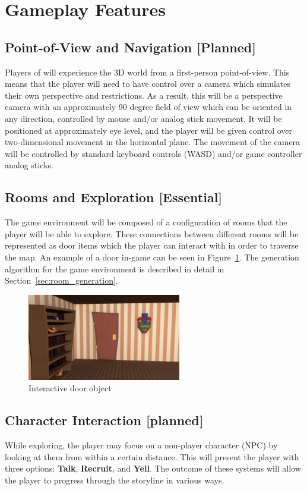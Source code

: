 \documentclass{GlobalDocument}
\begin{document}
\section {Gameplay Features}
\subsection{Point-of-View and Navigation [Planned]}
Players of \ourgame{} will experience the 3D world from a first-person point-of-view. This means that the player will need to have control over a camera which simulates their own perspective and restrictions. As a result, this will be a perspective camera with an approximately 90 degree field of view which can be oriented in any direction, controlled by mouse and/or analog stick movement. It will be positioned at approximately eye level, and the player will be given control over two-dimensional movement in the horizontal plane. The movement of the camera will be controlled by standard keyboard controls (WASD) and/or game controller analog sticks.

\subsection{Rooms and Exploration [Essential]}
The game environment will be composed of a configuration of rooms that the player will be able to explore. These connections between different rooms will be represented as door items which the player can interact with in order to traverse the map. An example of a door in-game can be seen in Figure~\ref{fig:door}. The generation algorithm for the game environment is described in detail in Section~\ref{sec:room_generation}.

\begin{figure}[htb]
\centering
\includegraphics[width=0.6\textwidth]{images/Door2}
\caption{Interactive door object}
\label{fig:door}
\end{figure}


\subsection{Character Interaction [planned]}
\label{sec:character_interaction}
While exploring, the player may focus on a non-player character (NPC) by looking at them from within a certain distance. This will present the player with three options: \textbf{Talk}, \textbf{Recruit}, and \textbf{Yell}. The outcome of these systems will allow the player to progress through the storyline in various ways. 
\end{document}
